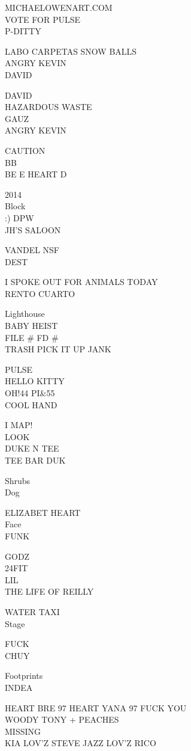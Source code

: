 \documentclass[10pt,letterpaper]{article}
\begin{document}
MICHAELOWENART.COM\\
VOTE FOR PULSE\\
P{-}DITTY

LABO CARPETAS SNOW BALLS\\
ANGRY KEVIN\\
DAVID

DAVID\\
HAZARDOUS WASTE\\
GAUZ\\
ANGRY KEVIN

CAUTION\\
BB\\
BE E HEART D

2014\\
Block\\
:) DPW\\
JH'S SALOON

VANDEL NSF\\
DEST

I SPOKE OUT FOR ANIMALS TODAY\\
RENTO CUARTO

Lighthouse\\
BABY HEIST\\
FILE \# FD \#\\
TRASH PICK IT UP JANK

PULSE\\
HELLO KITTY\\
OH!44 PI\&55\\
COOL HAND

I MAP!\\
LOOK\\
DUKE N TEE\\
TEE BAR DUK

Shrubs\\
Dog

ELIZABET HEART\\
Face\\
FUNK

GODZ\\
24FIT\\
LIL\\
THE LIFE OF REILLY

WATER TAXI\\
Stage

FUCK\\
CHUY

Footprints\\
INDEA

HEART BRE 97 HEART YANA 97 FUCK YOU\\
WOODY TONY + PEACHES\\
MISSING\\
KIA LOV'Z STEVE JAZZ LOV'Z RICO
\end{document}
